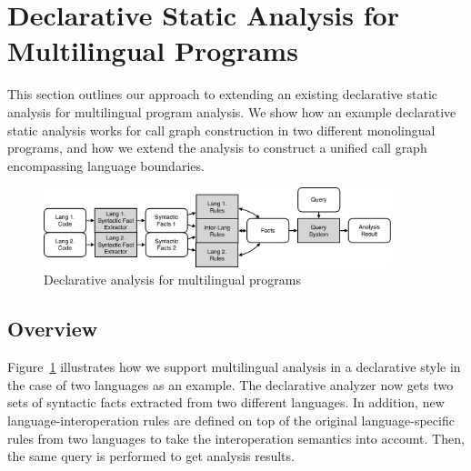 
\section{Declarative Static Analysis for Multilingual Programs}
This section outlines our approach to extending an existing
declarative static analysis for multilingual program analysis.
We show how an example declarative static analysis works
for call graph construction in two different monolingual programs, and
how we extend the analysis to construct a unified call graph
encompassing language boundaries.

\begin{figure}[t]
  \centering
  \vspace{2mm}
  \includegraphics[width=0.9\textwidth]{img/ov2.pdf}
  \caption{Declarative analysis for multilingual programs}
  \label{fig:ov2}
\end{figure}

\subsection{Overview}
Figure~\ref{fig:ov2} illustrates how we support multilingual analysis in a
declarative style in the case of two languages as an example. The declarative
analyzer now gets two sets of syntactic facts extracted from two different
languages. In addition, new language-interoperation rules are defined on top of
the original language-specific rules from two languages to take the
interoperation semantics into account. Then, the same query is performed to get
analysis results.

